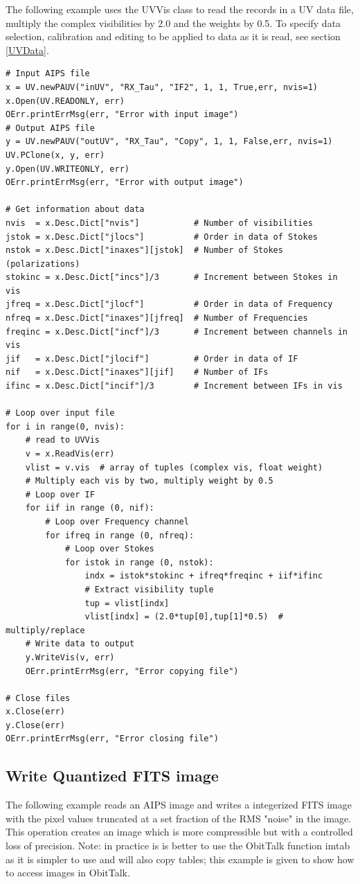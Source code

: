 \documentclass[11pt]{report}
\begin{document}
   The following example uses the UVVis class to read the records in a
UV data file, multiply the complex visibilities by 2.0 and the weights
by 0.5.
To specify data selection, calibration and editing to be applied to
data as it is read, see section \ref{UVData}.
\begin{verbatim}
# Input AIPS file
x = UV.newPAUV("inUV", "RX_Tau", "IF2", 1, 1, True,err, nvis=1)
x.Open(UV.READONLY, err)
OErr.printErrMsg(err, "Error with input image")
# Output AIPS file
y = UV.newPAUV("outUV", "RX_Tau", "Copy", 1, 1, False,err, nvis=1)
UV.PClone(x, y, err)
y.Open(UV.WRITEONLY, err)
OErr.printErrMsg(err, "Error with output image")

# Get information about data
nvis  = x.Desc.Dict["nvis"]           # Number of visibilities
jstok = x.Desc.Dict["jlocs"]          # Order in data of Stokes
nstok = x.Desc.Dict["inaxes"][jstok]  # Number of Stokes (polarizations)
stokinc = x.Desc.Dict["incs"]/3       # Increment between Stokes in vis
jfreq = x.Desc.Dict["jlocf"]          # Order in data of Frequency
nfreq = x.Desc.Dict["inaxes"][jfreq]  # Number of Frequencies
freqinc = x.Desc.Dict["incf"]/3       # Increment between channels in vis
jif   = x.Desc.Dict["jlocif"]         # Order in data of IF
nif   = x.Desc.Dict["inaxes"][jif]    # Number of IFs
ifinc = x.Desc.Dict["incif"]/3        # Increment between IFs in vis

# Loop over input file
for i in range(0, nvis):    
    # read to UVVis
    v = x.ReadVis(err)
    vlist = v.vis  # array of tuples (complex vis, float weight)
    # Multiply each vis by two, multiply weight by 0.5
    # Loop over IF
    for iif in range (0, nif):
        # Loop over Frequency channel
        for ifreq in range (0, nfreq):
            # Loop over Stokes
            for istok in range (0, nstok):
                indx = istok*stokinc + ifreq*freqinc + iif*ifinc
                # Extract visibility tuple
                tup = vlist[indx]
                vlist[indx] = (2.0*tup[0],tup[1]*0.5)  # multiply/replace
    # Write data to output
    y.WriteVis(v, err)
    OErr.printErrMsg(err, "Error copying file")

# Close files
x.Close(err)
y.Close(err)
OErr.printErrMsg(err, "Error closing file")
\end{verbatim}

\subsection{Write Quantized FITS image}
   The following example reads an AIPS image and writes a integerized FITS
image with the pixel values truncated at a set fraction of the RMS "noise"
in the image.  This operation creates an image which is more compressible
but with a controlled loss of precision.
Note: in practice is is better to use the ObitTalk function imtab as
it is simpler to use and will also copy tables; this example is given
to show how to access images in ObitTalk.
\end{document}
